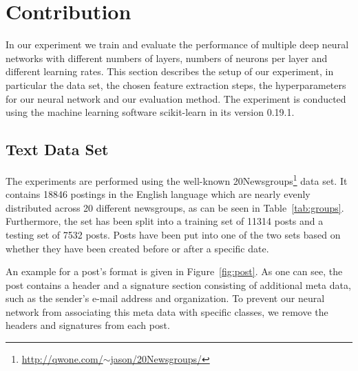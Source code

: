 \documentclass[sigconf]{acmart}
\begin{document}
\section{Contribution}

In our experiment we train and evaluate the performance of multiple deep neural networks with different numbers of layers, numbers of neurons per layer and different learning rates.
This section describes the setup of our experiment, in particular the data set, the chosen feature extraction steps, the hyperparameters for our neural network and our evaluation method. The experiment is conducted using the machine learning software scikit-learn\cite{scikit-learn} in its version 0.19.1.

\subsection{Text Data Set}
\label{text-data-set}

The experiments are performed using the well-known 20Newsgroups\footnote{\href{http://qwone.com/~jason/20Newsgroups/}{http://qwone.com/$\sim$jason/20Newsgroups/}} data set. It contains 18846 postings in the English language which are nearly evenly distributed across 20 different newsgroups, as can be seen in Table~\ref{tab:groups}. Furthermore, the set has been split into a training set of 11314 posts and a testing set of 7532 posts. Posts have been put into one of the two sets based on whether they have been created before or after a specific date\cite{sklearn-newsgroup}.

An example for a post's format is given in Figure~\ref{fig:post}. As one can see, the post contains a header and a signature section consisting of additional meta data, such as the sender's e-mail address and organization. To prevent our neural network from associating this meta data with specific classes, we remove the headers and signatures from each post.
\end{document}
